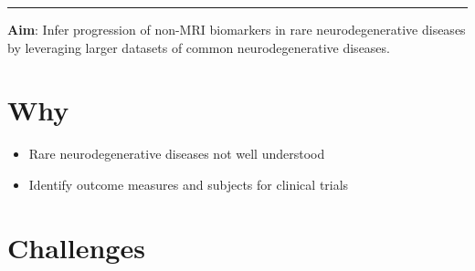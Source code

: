 \documentclass[portrait,a0,final,20pt]{a0poster}
\newcommand{\fnt}[1]{\LARGE{#1}}
\begin{document}
\fnt{


\newcommand{\lp}{\lambda_{d_i}^{\psi(k)}}
\newcommand{\lpuu}{\lambda_{d_i}^{\psi(k),(u)}}
\newcommand{\lpum}{\lambda_{d_i}^{\psi(k),(u-1)}}

\newcommand{\cmark}{\ding{51}}%
\newcommand{\xmark}{\ding{55}}%

\newcommand{\yes}{{\LARGE \textcolor{green!50!black}{\cmark} \par}}
\newcommand{\no}{{\LARGE \textcolor{red}{\xmark} \par}}

\hrule

\newcommand{\heading}[1]{\textbf{\Huge{#1}}}

\begin{multicols}{2}							
\raggedcolumns							%

\pagenumbering{gobble}

\vspace{-3em}

\heading{Aim}: Infer progression of non-MRI biomarkers in rare neurodegenerative diseases by leveraging larger datasets of common neurodegenerative diseases.

\section*{Why}

\begin{itemize}
 \item Rare neurodegenerative diseases not well understood
 \item Identify outcome measures and subjects for clinical trials
\end{itemize}

\columnbreak

\section*{Challenges}






\end{multicols}}
\end{document}
